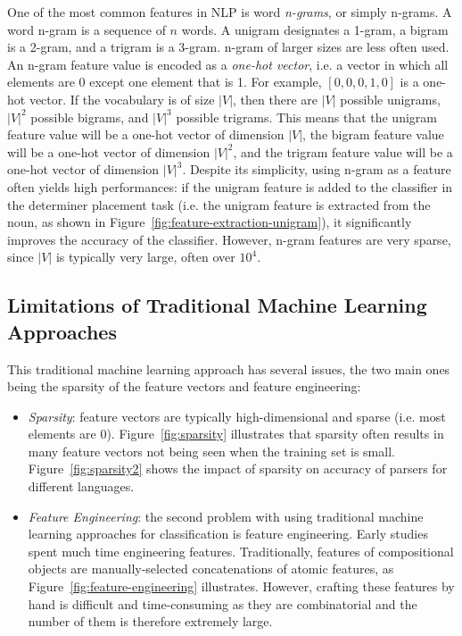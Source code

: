 \documentclass[justified, marginals=justified]{tufte-handout}
\begin{document}
One of the most common features in NLP is word \textit{n-grams}, or simply n-grams. A word n-gram is a sequence of $n$ words. A unigram designates a 1-gram, a bigram is a 2-gram, and a trigram is a 3-gram. n-gram of larger sizes are less often used.  An n-gram feature value is encoded as a \textit{one-hot vector}, i.e. a vector in which all elements are 0 except one element that is 1. For example, $[0, 0, 0, 1, 0]$ is a one-hot vector. If the vocabulary is of size $|V|$, then there are $|V|$ possible unigrams, $|V|^2$ possible bigrams, and $|V|^3$ possible trigrams. This means that the unigram feature value will be a one-hot vector of dimension $|V|$, the bigram feature value will be a one-hot vector of dimension $|V|^2$, and the trigram feature value will be a one-hot vector of dimension $|V|^3$. Despite its simplicity, using n-gram as a feature often yields high performances: if the unigram feature is added to the classifier in the determiner placement task (i.e. the unigram feature is extracted from the noun, as shown in Figure~\ref{fig:feature-extraction-unigram}), it significantly improves the accuracy of the classifier. However, n-gram features are very sparse, since $|V|$ is typically very large, often over $10^4$.






\subsection{Limitations of Traditional Machine Learning Approaches}\label{sec:ml-limitations}

This traditional machine learning approach has several issues, the two main ones being the sparsity of the feature vectors and feature engineering:


\begin{itemize}
\item \textit{Sparsity}: feature vectors are typically high-dimensional and sparse (i.e. most elements are $0$). Figure~\ref{fig:sparsity} illustrates that sparsity often results in many feature vectors not being seen when the training set is small. Figure~\ref{fig:sparsity2} shows the impact of sparsity on accuracy of parsers for different languages. 
\item \textit{Feature Engineering}: the second problem with using traditional machine learning approaches for classification is feature engineering. Early studies spent much time engineering features. Traditionally, features of compositional objects are manually-selected concatenations of atomic features, as Figure~\ref{fig:feature-engineering} illustrates. However, crafting these features by hand is difficult and time-consuming as they are combinatorial and the number of them is therefore extremely large.
\end{itemize}
\end{document}
